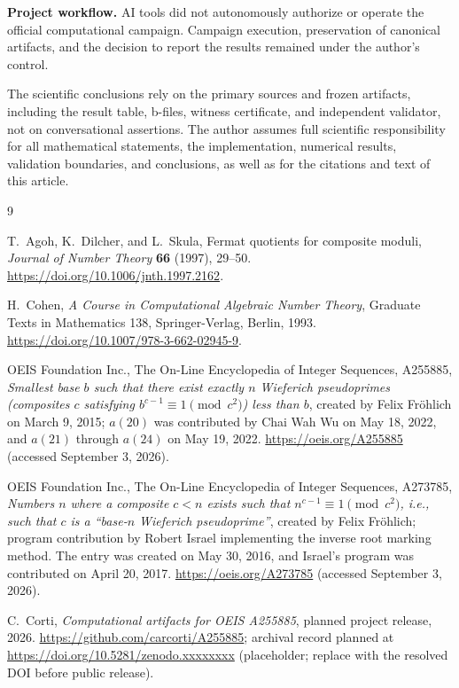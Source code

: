 \documentclass[11pt]{article}
\begin{document}
\textbf{Project workflow.}
AI tools did not autonomously authorize or operate the official computational
campaign.  Campaign execution, preservation of canonical artifacts, and the
decision to report the results remained under the author's control.

The scientific conclusions rely on the primary sources and frozen artifacts,
including the result table, b-files, witness certificate, and independent
validator, not on conversational assertions.  The author assumes full
scientific responsibility for all mathematical statements, the
implementation, numerical results, validation boundaries, and conclusions,
as well as for the citations and text of this article.

\clearpage
\begin{thebibliography}{9}

T.~Agoh, K.~Dilcher, and L.~Skula,
Fermat quotients for composite moduli,
\emph{Journal of Number Theory} \textbf{66} (1997), 29--50.
\url{https://doi.org/10.1006/jnth.1997.2162}.

H.~Cohen,
\emph{A Course in Computational Algebraic Number Theory},
Graduate Texts in Mathematics 138, Springer-Verlag, Berlin, 1993.
\url{https://doi.org/10.1007/978-3-662-02945-9}.

OEIS Foundation Inc.,
The On-Line Encyclopedia of Integer Sequences, A255885,
\emph{Smallest base $b$ such that there exist exactly $n$ Wieferich
pseudoprimes (composites $c$ satisfying
$b^{c-1}\equiv1\pmod{c^2}$) less than $b$},
created by Felix Fr\"ohlich on March 9, 2015; $a(20)$ was contributed by
Chai Wah Wu on May 18, 2022, and $a(21)$ through $a(24)$ on May 19, 2022.
\url{https://oeis.org/A255885} (accessed September 3, 2026).

OEIS Foundation Inc.,
The On-Line Encyclopedia of Integer Sequences, A273785,
\emph{Numbers $n$ where a composite $c<n$ exists such that
$n^{c-1}\equiv1\pmod{c^2}$, i.e., such that $c$ is a ``base-$n$ Wieferich
pseudoprime''}, created by Felix Fr\"ohlich; program contribution by Robert
Israel implementing the inverse root marking method.  The entry was created
on May 30, 2016, and Israel's program was contributed on April 20, 2017.
\url{https://oeis.org/A273785} (accessed September 3, 2026).

C.~Corti,
\emph{Computational artifacts for OEIS A255885}, planned project release,
2026.
\url{https://github.com/carcorti/A255885}; archival record planned at
\url{https://doi.org/10.5281/zenodo.xxxxxxxx} (placeholder; replace with the
resolved DOI before public release).

\end{thebibliography}
\end{document}
